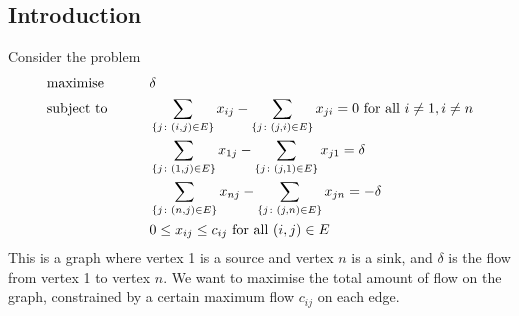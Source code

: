 \subsection{Introduction}
Consider the problem
\begin{alignat*}{2}
	 & \text{maximise}   & \qquad & \delta                                                                                                                      \\
	 & \text{subject to} &        & \sum_{\qty{j \colon (i,j) \in E}} x_{ij} - \sum_{\qty{j \colon (j,i) \in E}} x_{ji} = 0 \text{ for all } i \neq 1, i \neq n \\
	 &                   &        & \sum_{\qty{j \colon (1,j) \in E}} x_{1j} - \sum_{\qty{j \colon (j,1) \in E}} x_{j1} = \delta                                \\
	 &                   &        & \sum_{\qty{j \colon (n,j) \in E}} x_{nj} - \sum_{\qty{j \colon (j,n) \in E}} x_{jn} = -\delta                               \\
	 &                   &        & 0 \leq x_{ij} \leq c_{ij} \text{ for all } (i,j) \in E
\end{alignat*}
This is a graph where vertex 1 is a source and vertex \( n \) is a sink, and \( \delta \) is the flow from vertex 1 to vertex \( n \).
We want to maximise the total amount of flow on the graph, constrained by a certain maximum flow \( c_{ij} \) on each edge.

